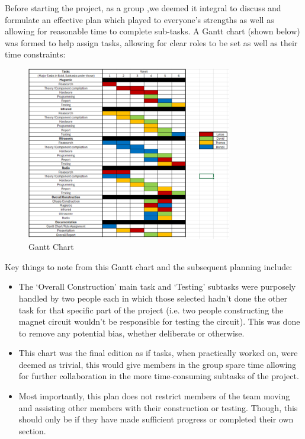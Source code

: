 Before starting the project, as a group ,we deemed it integral to discuss and formulate an effective plan which played to everyone’s strengths as well as allowing for reasonable time to complete sub-tasks. A Gantt chart (shown below) was formed to help assign tasks, allowing for clear roles to be set as well as their time constraints:

\begin{figure}[h]
    \centering
    \includegraphics[width=0.8\textwidth]{subpages/images/gantt_chart.png}
    \caption{Gantt Chart}
    \label{fig:gantt}
\end{figure}

Key things to note from this Gantt chart and the subsequent planning include:
\begin{itemize}
    \item The `Overall Construction' main task and `Testing' subtasks were purposely handled by two people each in which those selected hadn’t done the other task for that specific part of the project (i.e. two people constructing the magnet circuit wouldn’t be responsible for testing the circuit). This was done to remove any potential bias, whether deliberate or otherwise.
    \item This chart was the final edition as if tasks, when practically worked on, were deemed as trivial, this would give members in the group spare time allowing for further collaboration in the more time-consuming subtasks of the project.
    \item Most importantly, this plan does not restrict members of the team moving and assisting other members with their construction or testing. Though, this should only be if they have made sufficient progress or completed their own section.
\end{itemize}